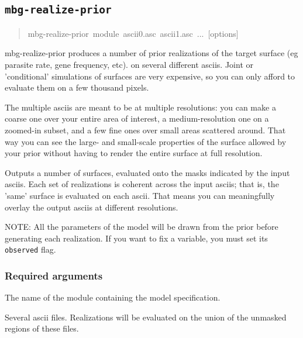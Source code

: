 \subsection{\texttt{mbg-realize-prior}%
}
%
\begin{quote}{\ttfamily \raggedright \noindent
mbg-realize-prior~module~ascii0.asc~ascii1.asc~...~{[}options{]}
}
\end{quote}

mbg-realize-prior produces a number of prior realizations of the target surface (eg parasite
rate, gene frequency, etc). on several different asciis. Joint or 'conditional' simulations
of surfaces are very expensive, so you can only afford to evaluate them on a few thousand
pixels.

The multiple asciis are meant to be at multiple resolutions: you can make a coarse one over
your entire area of interest, a medium-resolution one on a zoomed-in subset, and a few fine
ones over small areas scattered around. That way you can see the large- and small-scale
properties of the surface allowed by your prior without having to render the entire surface
at full resolution.

Outputs a number of surfaces, evaluated onto the masks indicated by the input asciis. Each set
of realizations is coherent across the input asciis; that is, the 'same' surface is evaluated
on each ascii. That means you can meaningfully overlay the output asciis at different
resolutions.

NOTE: All the parameters of the model will be drawn from the prior before generating each
realization. If you want to fix a variable, you must set its \texttt{observed} flag.




\subsubsection{Required arguments%
}
\setcounter{listcnt0}{0}
\begin{list}{.}
{
\setlength{\rightmargin}{\leftmargin}
}

\item The name of the module containing the model specification.

\item Several ascii files. Realizations will be evaluated on the union of the unmasked regions
of these files.
\end{list}




